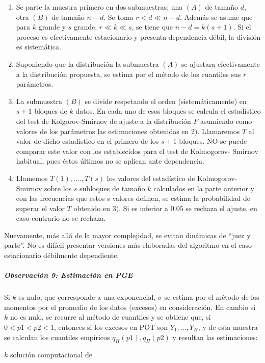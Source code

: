 \documentclass[
  12pt]{article}
\begin{document}
\begin{itemize}
\begin{enumerate}
\item Se parte la muestra primero en dos submuestras: una $(A)$ de tamaño $d$, otra $(B)$ de tamaño $n-d$. Se toma $r< d \ll n-d$. Además se asume que para $k$ grande y $s$ grande, $r\ll k \ll s$, se tiene que $n-d= k(s+1)$. Si el proceso es efectivamente estacionario y presenta dependencia débil, la división es sistemática.
\item Suponiendo que la distribución la submuestra $(A)$ se ajustara efectivamente a la distribución propuesta, se estima por el método de los cuantiles sus $r$ parámetros.
\item La submuestra $(B)$ se divide respetando el orden (sistemáticamente) en $s+1$ bloques de $k$ datos. En cada uno de esos bloques se calcula el estadístico del test de Kolgorov-Smirnov de ajuste a la distribución $F$ asumiendo como valores de los parámetros las estimaciones obtenidas en $2)$. Llamaremos $T$ al valor de dicho estadístico en el primero de los $s+1$ bloques. NO se puede comparar este valor con los establecidos para el test de Kolmogorov- Smirnov habitual, pues éstos últimos no se aplican ante dependencia.
\item Llamemos $T(1),....,T(s)$ los valores del estadístico de Kolmogorov-Smirnov sobre los $s$ subloques de tamaño $k$ calculados en la parte anterior y con las frecuencias que estos s valores definen, se estima la probabilidad de superar el valor $T$ obtenido en $3)$. Si es inferior a $0.05$ se rechaza el ajuste, en caso contrario no se rechaza.
\end{enumerate}
Nuevamente, más allá de la mayor complejidad, se evitan dinámicas de “juez y parte”. No es difícil presentar versiones más elaboradas del algoritmo en el caso estacionario débilmente dependiente.
\end{itemize}

\subparagraph{Observación 9: Estimación en
PGE}\label{observaciuxf3n-9-estimaciuxf3n-en-pge}

Si \(k\) es nulo, que corresponde a una exponencial, \(\sigma\) se
estima por el método de los momentos por el promedio de los datos
(excesos) en consideración. En cambio si \(k\) no es nulo, se recurre al
método de cuantiles y se obtiene que, si \(0<p1<p2<1\), entonces si los
excesos en POT son \(Y_1,...,Y_H\), y de esta muestra se calculan los
cuantiles empíricos \(q_H(p1), q_H(p2)\) y resultan las estimaciones:

\(k\) solución computacional de
\end{document}
